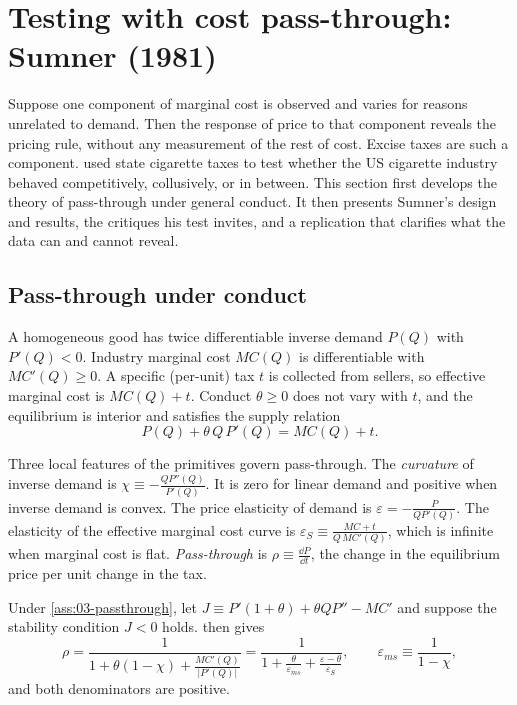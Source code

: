 \section{Testing with cost pass-through: Sumner (1981)}\label{sec:03-sumner}

Suppose one component of marginal cost is observed and varies for reasons unrelated to demand. Then the response of
price to that component reveals the pricing rule, without any measurement of the rest of cost. Excise taxes are such
a component. \citet{Sumner1981} used state cigarette taxes to test whether the US cigarette industry behaved
competitively, collusively, or in between. This section first develops the theory of pass-through under general conduct.
It then presents Sumner's design and results, the critiques his test invites, and a replication that clarifies what the
data can and cannot reveal.

\subsection{Pass-through under conduct}\label{sec:03-passthrough-theory}

\begin{assumption}\label{ass:03-passthrough}
A homogeneous good has twice differentiable inverse demand $P(Q)$ with $P'(Q) < 0$. Industry marginal cost $MC(Q)$ is
differentiable with $MC'(Q) \ge 0$. A specific (per-unit) tax $t$ is collected from sellers, so effective marginal cost
is $MC(Q) + t$. Conduct $\theta \ge 0$ does not vary with $t$, and the equilibrium is interior and satisfies the supply
relation
\begin{equation}\label{eq:03-supply-tax}
P(Q) + \theta\, Q\, P'(Q) = MC(Q) + t .
\end{equation}
\end{assumption}

Three local features of the primitives govern pass-through. The \emph{curvature} of inverse demand is
$\chi \equiv -\frac{Q P''(Q)}{P'(Q)}$. It is zero for linear demand and positive when inverse demand is convex. The
price elasticity of demand is $\varepsilon = -\frac{P}{Q P'(Q)}$. The elasticity of the effective marginal cost curve
is $\varepsilon_S \equiv \frac{MC + t}{Q\, MC'(Q)}$, which is infinite when marginal cost is flat. \emph{Pass-through}
is $\rho \equiv \frac{\dd P}{\dd t}$, the change in the equilibrium price per unit change in the tax.

\begin{proposition}\label{prop:03-passthrough}
Under \cref{ass:03-passthrough}, let $J \equiv P'(1 + \theta) + \theta Q P'' - MC'$ and suppose the stability condition
$J < 0$ holds.  then gives
\begin{equation}\label{eq:03-passthrough-general}
\rho = \frac{1}{1 + \theta(1 - \chi) + \frac{MC'(Q)}{\lvert P'(Q)\rvert}}
     = \frac{1}{1 + \frac{\theta}{\varepsilon_{ms}} + \frac{\varepsilon - \theta}{\varepsilon_S}},
\qquad \varepsilon_{ms} \equiv \frac{1}{1 - \chi},
\end{equation}
and both denominators are positive.
\end{proposition}

